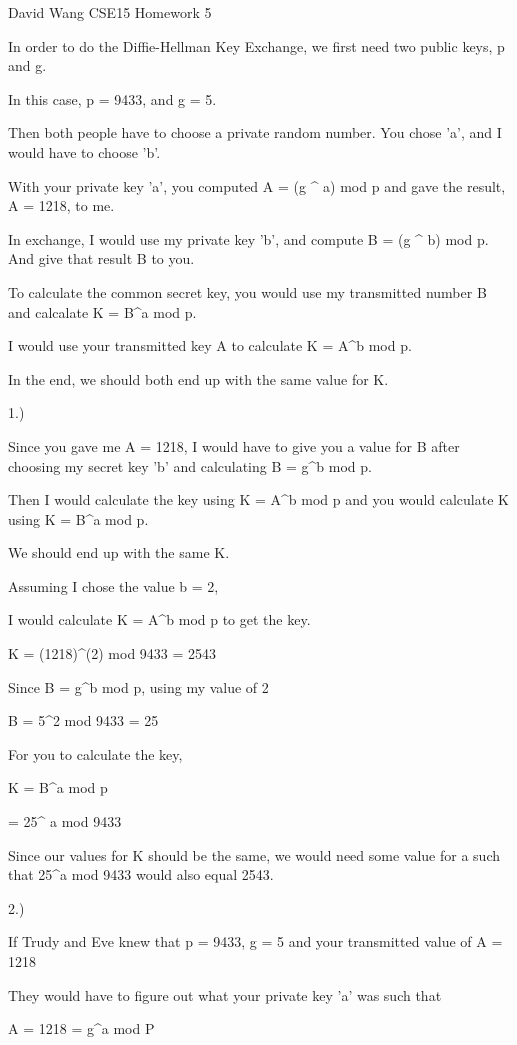 David Wang
CSE15
Homework 5




In order to do the Diffie-Hellman Key Exchange, we first need two public keys, p and g.

In this case, p = 9433, and g = 5.

Then both people have to choose a private random number. You chose 'a', and I would have to choose 'b'.

With your private key 'a', you computed A = (g ^ a) mod p and gave the result, A = 1218, to me.

In exchange, I would use my private key 'b', and compute B = (g ^ b) mod p. And give that result B to you.

To calculate the common secret key, you would use my transmitted number B and calcalate  K = B^a mod p.

I would use your transmitted key A to calculate K = A^b mod p.

In the end, we should both end up with the same value for K.

1.) 

Since you gave me A = 1218, I would have to give you a value for B after choosing my secret key 'b' and calculating B = g^b mod p.

Then I would calculate the key using K = A^b mod p and you would calculate K using K = B^a mod p.

We should end up with the same K.

Assuming I chose the value b = 2, 

I would calculate K = A^b mod p to get the key.

K = (1218)^(2) mod 9433 = 2543

Since B = g^b mod p, using my value of 2

B = 5^2 mod 9433 = 25

For you to calculate the key,

K = B^a mod p

= 25^ a mod 9433

Since our values for K should be the same, we would need some value for a such that 25^a mod 9433 would also equal 2543.

2.)

If Trudy and Eve knew that p = 9433, g = 5 and your transmitted value of A = 1218 

They would have to figure out what your private key 'a' was such that 

A = 1218 = g^a mod P

